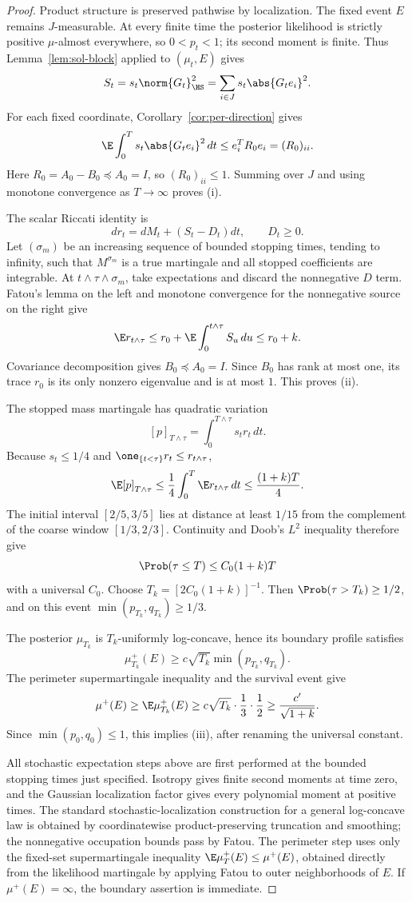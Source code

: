 \documentclass[../main.tex]{subfiles}
\begin{document}
\begin{proof}
Product structure is preserved pathwise by localization.  The fixed event $E$ remains
$J$-measurable.  At every finite time the posterior likelihood is strictly positive
$\mu$-almost everywhere, so $0<p_t<1$; its second moment is finite.  Thus
Lemma~\ref{lem:sol-block} applied to $(\mu_t,E)$ gives
\[
  S_t=s_t\norm{G_t}_{\HS}^2
     =\sum_{i\in J}s_t\abs{G_te_i}^2.
\]
For each fixed coordinate, Corollary~\ref{cor:per-direction} gives
\[
  \E\int_0^T s_t\abs{G_te_i}^2\,dt
  \le e_i^TR_0e_i=(R_0)_{ii}.
\]
Here $R_0=A_0-B_0\preceq A_0=I$, so $(R_0)_{ii}\le1$.  Summing over $J$ and using monotone
convergence as $T\to\infty$ proves (i).

The scalar Riccati identity is
\[
  dr_t=dM_t+(S_t-D_t)dt,
  \qquad D_t\ge0.
\]
Let $(\sigma_m)$ be an increasing sequence of bounded stopping times, tending to infinity,
such that $M^{\sigma_m}$ is a true martingale and all stopped coefficients are integrable.
At $t\wedge\tau\wedge\sigma_m$, take expectations and discard the nonnegative $D$ term.
Fatou's lemma on the left and monotone convergence for the nonnegative source on the right give
\[
  \E r_{t\wedge\tau}
  \le r_0+\E\int_0^{t\wedge\tau}S_u\,du
  \le r_0+k.
\]
Covariance decomposition gives $B_0\preceq A_0=I$.  Since $B_0$ has rank at most one, its trace
$r_0$ is its only nonzero eigenvalue and is at most $1$.  This proves (ii).

The stopped mass martingale has quadratic variation
\[
  [p]_{T\wedge\tau}=\int_0^{T\wedge\tau}s_tr_t\,dt.
\]
Because $s_t\le1/4$ and
$\one_{\{t<\tau\}}r_t\le r_{t\wedge\tau}$,
\[
  \E[p]_{T\wedge\tau}
  \le\frac14\int_0^T\E r_{t\wedge\tau}\,dt
  \le\frac{(1+k)T}{4}.
\]
The initial interval $[2/5,3/5]$ lies at distance at least $1/15$ from the complement of the
coarse window $[1/3,2/3]$.  Continuity and Doob's $L^2$ inequality therefore give
\[
  \Prob(\tau\le T)\le C_0(1+k)T
\]
with a universal $C_0$.  Choose $T_k=[2C_0(1+k)]^{-1}$.  Then
$\Prob(\tau>T_k)\ge1/2$, and on this event
$\min(p_{T_k},q_{T_k})\ge1/3$.

The posterior $\mu_{T_k}$ is $T_k$-uniformly log-concave, hence its boundary profile satisfies
\[
  \mu_{T_k}^+(E)\ge c\sqrt{T_k}\min(p_{T_k},q_{T_k}).
\]
The perimeter supermartingale inequality and the survival event give
\[
  \mu^+(E)
  \ge\E\mu_{T_k}^+(E)
  \ge c\sqrt{T_k}\cdot\frac13\cdot\frac12
  \ge\frac{c'}{\sqrt{1+k}}.
\]
Since $\min(p_0,q_0)\le1$, this implies (iii), after renaming the universal constant.

All stochastic expectation steps above are first performed at the bounded stopping times just
specified.  Isotropy gives finite second moments at time zero, and the Gaussian localization
factor gives every polynomial moment at positive times.  The standard stochastic-localization
construction for a general log-concave law is obtained by coordinatewise product-preserving
truncation and smoothing; the nonnegative occupation bounds pass by Fatou.  The perimeter step
uses only the fixed-set supermartingale inequality
$\E\mu_T^+(E)\le\mu^+(E)$, obtained directly from the likelihood martingale by applying Fatou
to outer neighborhoods of $E$.  If $\mu^+(E)=\infty$, the boundary assertion is immediate.
\end{proof}
\end{document}
